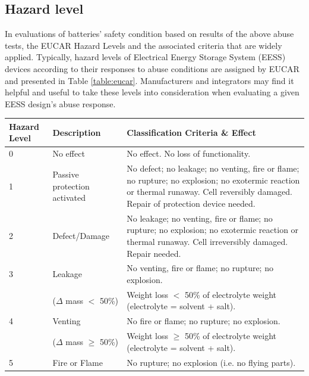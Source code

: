\subsection{Hazard level}
\label{sec:hazard-level}
In evaluations of batteries' safety condition based on results of the above abuse tests, the EUCAR Hazard Levels and the associated criteria that are widely applied. Typically, hazard levels of Electrical Energy Storage System (EESS) devices according to their responses to abuse conditions are assigned by EUCAR and presented in Table \ref{table:eucar}. Manufacturers and integrators may find it helpful and useful to take these levels into consideration when evaluating a given EESS design's abuse response.

\begin{table}[ht]
    \centering
        \begin{footnotesize}
            \begin{tabular}{|p{13mm} p{28mm} p{102mm}|}
                \hline
                \rowcolor{bluepoli!40}
                \textbf{Hazard Level} & \textbf{Description} & \textbf{Classification Criteria \& Effect}\T\B \\
                \hline \hline
                0 & No effect & No effect. No loss of functionality.\T\B\\
                \hline
                1 & Passive protection activated & No defect; no leakage; no venting, fire or flame; no rupture; no explosion; no exotermic reaction or thermal runaway. Cell reversibly damaged. Repair of protection device needed.\T\B\\
                \hline
                2 & Defect/Damage & No leakage; no venting, fire or flame; no rupture; no explosion; no exotermic reaction or thermal runaway. Cell irreversibly damaged. Repair needed.\T\B\\
                \hline
                3 & Leakage & No venting, fire or flame; no rupture; no explosion.\\
                & ($\Delta$ mass $<$ 50\%) & Weight loss $<$ 50\% of electrolyte weight (electrolyte = solvent + salt).\T\B\\
                \hline
                4 & Venting & No fire or flame; no rupture; no explosion.\\
                & ($\Delta$ mass $\geq$ 50\%) & Weight loss $\geq$ 50\% of electrolyte weight (electrolyte = solvent + salt).\T\B\\
                \hline
                5 & Fire or Flame & No rupture; no explosion (i.e. no flying parts).\T\B\\

\end{tabular}
\end{footnotesize}
\end{table}
